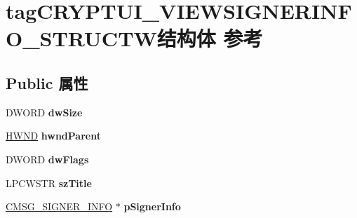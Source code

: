 \hypertarget{structtag_c_r_y_p_t_u_i___v_i_e_w_s_i_g_n_e_r_i_n_f_o___s_t_r_u_c_t_w}{}\section{tag\+C\+R\+Y\+P\+T\+U\+I\+\_\+\+V\+I\+E\+W\+S\+I\+G\+N\+E\+R\+I\+N\+F\+O\+\_\+\+S\+T\+R\+U\+C\+T\+W结构体 参考}
\label{structtag_c_r_y_p_t_u_i___v_i_e_w_s_i_g_n_e_r_i_n_f_o___s_t_r_u_c_t_w}
\subsection*{Public 属性}
\begin{DoxyCompactItemize}
\item 
\mbox{\label{structtag_c_r_y_p_t_u_i___v_i_e_w_s_i_g_n_e_r_i_n_f_o___s_t_r_u_c_t_w_aecbd2a2350d2349ab382033ee1beb333}} 
D\+W\+O\+RD {\bfseries dw\+Size}
\item 
\mbox{\label{structtag_c_r_y_p_t_u_i___v_i_e_w_s_i_g_n_e_r_i_n_f_o___s_t_r_u_c_t_w_a5d4d4f8324962756d154de63755380b8}} 
\hyperlink{interfacevoid}{H\+W\+ND} {\bfseries hwnd\+Parent}
\item 
\mbox{\label{structtag_c_r_y_p_t_u_i___v_i_e_w_s_i_g_n_e_r_i_n_f_o___s_t_r_u_c_t_w_a456e3750a2b00a5feab31e217dcdd9ef}} 
D\+W\+O\+RD {\bfseries dw\+Flags}
\item 
\mbox{\label{structtag_c_r_y_p_t_u_i___v_i_e_w_s_i_g_n_e_r_i_n_f_o___s_t_r_u_c_t_w_a31fdc06f4a4049f8f7cf9f34a04b4fbe}} 
L\+P\+C\+W\+S\+TR {\bfseries sz\+Title}
\item 
\mbox{\label{structtag_c_r_y_p_t_u_i___v_i_e_w_s_i_g_n_e_r_i_n_f_o___s_t_r_u_c_t_w_a9a35a4f437bafc5b4bc92048a71ec6e8}} 
\hyperlink{struct___c_m_s_g___s_i_g_n_e_r___i_n_f_o}{C\+M\+S\+G\+\_\+\+S\+I\+G\+N\+E\+R\+\_\+\+I\+N\+FO} $\ast$ {\bfseries p\+Signer\+Info}

\end{DoxyCompactItemize}
